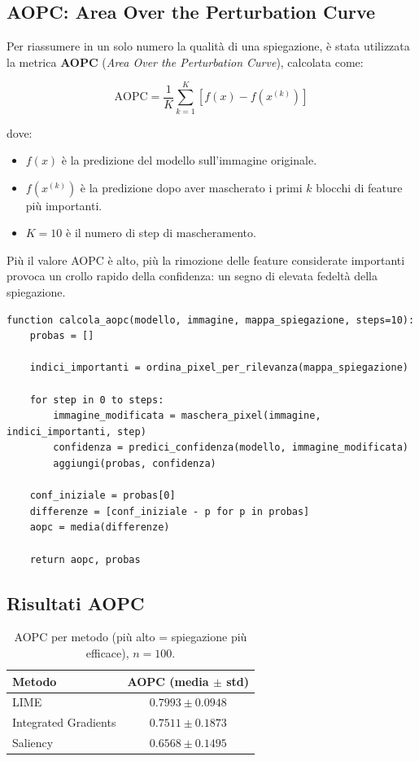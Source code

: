 \documentclass{article}
\begin{document}
\subsection{AOPC: Area Over the Perturbation Curve}
Per riassumere in un solo numero la qualità di una spiegazione, è stata
utilizzata la metrica \textbf{AOPC} (\emph{Area Over the Perturbation Curve}),
calcolata come:

\[
      \mathrm{AOPC} = \frac{1}{K} \sum_{k=1}^K \left[ f(x) - f(x^{(k)}) \right]
\]

dove:
\begin{itemize}
      \item $f(x)$ è la predizione del modello sull’immagine originale.
      \item $f(x^{(k)})$ è la predizione dopo aver mascherato i primi $k$ blocchi di feature più importanti.
      \item $K=10$ è il numero di step di mascheramento.
\end{itemize}

Più il valore AOPC è alto, più la rimozione delle feature considerate
importanti provoca un crollo rapido della confidenza: un segno di elevata
fedeltà della spiegazione.

\begin{lstlisting}[caption={Procedura MoRF e calcolo AOPC}, label={lst:morf_aopc}]
function calcola_aopc(modello, immagine, mappa_spiegazione, steps=10):
    probas = []
    
    indici_importanti = ordina_pixel_per_rilevanza(mappa_spiegazione)
    
    for step in 0 to steps:
        immagine_modificata = maschera_pixel(immagine, indici_importanti, step)
        confidenza = predici_confidenza(modello, immagine_modificata)
        aggiungi(probas, confidenza)
    
    conf_iniziale = probas[0]
    differenze = [conf_iniziale - p for p in probas]
    aopc = media(differenze)
    
    return aopc, probas
\end{lstlisting}

\subsection{Risultati AOPC}
\begin{table}[h!]
      \centering
      \renewcommand{\arraystretch}{1.1}
      \begin{tabular}{lc}
            \hline
            \textbf{Metodo}      & \textbf{AOPC (media $\pm$ std)} \\
            \hline
            LIME                 & $0.7993 \pm 0.0948$             \\
            Integrated Gradients & $0.7511 \pm 0.1873$             \\
            Saliency             & $0.6568 \pm 0.1495$             \\
            \hline
      \end{tabular}
      \caption{AOPC per metodo (più alto = spiegazione più efficace), $n=100$.}
      \label{tab:aopc_results}
\end{table}
\end{document}
